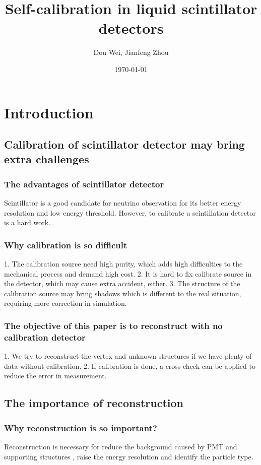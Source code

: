 \documentclass{article}
\title{Self-calibration in liquid scintillator detectors}
\author{Dou Wei, Jianfeng Zhou}
\date{\today}
\begin{document}
\maketitle
\abstract{}
\section{Introduction}
\subsection{Calibration of scintillator detector may bring extra challenges}
\subsubsection{The advantages of scintillator detector}
\par Scintillator is a good candidate for neutrino observation for its better energy resolution and low energy threshold. However, to calibrate a scintillation detector is a hard work.
\subsubsection{Why calibration is so difficult}
\par 1. The calibration source need high purity, which adds high difficulties to the mechanical process and demand high cost. 2. It is hard to fix calibrate source in the detector, which may cause extra accident, either. 3. The structure of the calibration source may bring shadows which is different to the real situation, requiring more correction in simulation.
\subsubsection{The objective of this paper is to reconstruct with no calibration detector}
\par 1.  We try to reconstruct the vertex and unknown structures if we have plenty of data without calibration. 2. If calibration is done, a cross check can be applied to reduce the error in measurement. 
\subsection{The importance of reconstruction}
\subsubsection{Why reconstruction is so important?}
\par Reconstruction is necessary for reduce the background caused by PMT and supporting structures , raise the energy resolution and identify the particle type. 
\end{document}
